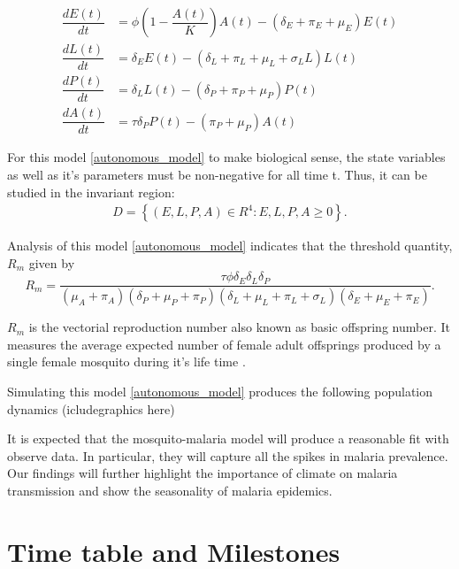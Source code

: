 \documentclass[12pt,a4paper,titlepage]{article}
\begin{document}
\begin{subequations}
	\label{autonomous_model}
	\begin{align}
		\dfrac{dE(t)}{dt} &= \phi\left(1-\dfrac{A(t)}{K}\right)A(t) - \left( \delta_E  + \pi_E+ \mu_E\right)E(t)\\
		\dfrac{dL(t)}{dt} &= \delta_EE(t) - \left( \delta_L  + \pi_L+ \mu_L + \sigma_L L\right)L(t)\\
		\dfrac{dP(t)}{dt} &= \delta_LL(t) - \left( \delta_P  + \pi_P+ \mu_P \right)P(t)\\
		\dfrac{dA(t)}{dt} &= \tau \delta_PP(t) - \left( \pi_P+ \mu_P \right)A(t)
	\end{align}
\end{subequations}

For this model \ref{autonomous_model} to make biological sense, the state variables as well as it's parameters must be non-negative for all time t. Thus, it can be studied in the invariant region: 
\begin{align}
D = \left\{ (E, L, P, A) \in R^4 : E, L, P, A \geq 0 \right\}.
\end{align}

Analysis of this model \ref{autonomous_model} indicates that the threshold quantity, $R_m$ given by 
\begin{equation}
	\label{R_m}
	R_m = \frac{\tau\phi\delta_E\delta_L\delta_P}{(\mu_A+\pi_A)(\delta_P+\mu_P+\pi_P)(\delta_L+\mu_L+\pi_L + \sigma_L)(\delta_E+\mu_E+\pi_E)}.
\end{equation}

$R_m$ is the vectorial reproduction number also known as basic offspring number. It measures the average expected number of female adult offsprings produced by a single female mosquito during it's life time \cite{abdelrazec2017mathematical, hamdan2020effect}. 


Simulating this model \ref{autonomous_model} produces the following population dynamics (icludegraphics here)


It is expected that the mosquito-malaria model will produce a reasonable fit with observe data. In particular, they will capture all the spikes in malaria prevalence. Our findings will further highlight the importance of climate on malaria transmission and show the seasonality of malaria epidemics. 


\section{Time table and Milestones}







\end{document}
